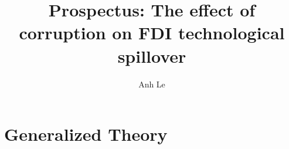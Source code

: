 \documentclass[12pt]{article}
\title{Prospectus: The effect of corruption on FDI technological spillover}
\author{Anh Le}
\begin{document}
\maketitle

\section{Generalized Theory}

\end{document}
